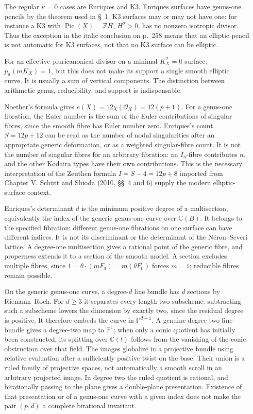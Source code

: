 The regular \(\kappa=0\) cases are Enriques and K3. Enriques surfaces have genus-one pencils by the theorem used in \S~1. K3 surfaces may or may not have one: for instance a K3 with \(\operatorname{Pic}(X)=\mathbb Z H\), \(H^2>0\), has no nonzero isotropic divisor. Thus the exception in the italic conclusion on p.~258 means that an elliptic pencil is not automatic for K3 surfaces, not that no K3 surface can be elliptic.

For an effective pluricanonical divisor on a minimal \(K_X^2=0\) surface, \(p_a(mK_X)=1\), but this does not make its support a single smooth elliptic curve. It is usually a sum of vertical components. The distinction between arithmetic genus, reducibility, and support is indispensable.

Noether's formula gives \(e(X)=12\chi(\mathcal O_X)=12(p+1)\). For a genus-one fibration, the Euler number is the sum of the Euler contributions of singular fibres, since the smooth fibre has Euler number zero. Enriques's count \(S=12p+12\) can be read as the number of nodal singularities after an appropriate generic deformation, or as a weighted singular-fibre count. It is not the number of singular fibres for an arbitrary fibration: an \(I_n\)-fibre contributes \(n\), and the other Kodaira types have their own contributions. This is the necessary interpretation of the Zeuthen formula \(I=S-4=12p+8\) imported from Chapter V. Schütt and Shioda (2010, \S\S~4 and 6) supply the modern elliptic-surface context.

Enriques's determinant \(d\) is the minimum positive degree of a multisection, equivalently the index of the generic genus-one curve over \(\mathbb C(B)\). It belongs to the specified fibration: different genus-one fibrations on one surface can have different indices. It is not its discriminant or the determinant of the Néron--Severi lattice. A degree-one multisection gives a rational point of the generic fibre, and properness extends it to a section of the smooth model. A section excludes multiple fibres, since \(1=\theta\cdot(mF_0)=m(\theta F_0)\) forces \(m=1\); reducible fibres remain possible.

On the generic genus-one curve, a degree-\(d\) line bundle has \(d\) sections by Riemann--Roch. For \(d\ge3\) it separates every length-two subscheme: subtracting such a subscheme lowers the dimension by exactly two, since the residual degree is positive. It therefore embeds the curve in \(\mathbb P^{d-1}\). A genuine degree-two line bundle gives a degree-two map to \(\mathbb P^1\); when only a conic quotient has initially been constructed, its splitting over \(\mathbb C(t)\) follows from the vanishing of the conic obstruction over that field. The images globalize in a projective bundle using relative evaluation after a sufficiently positive twist on the base. Their union is a ruled family of projective spaces, not automatically a smooth scroll in an arbitrary projected image. In degree two the ruled quotient is rational, and birationally passing to the plane gives a double-plane presentation. Existence of that presentation or of a genus-one curve with a given index does not make the pair \((p,d)\) a complete birational invariant.

